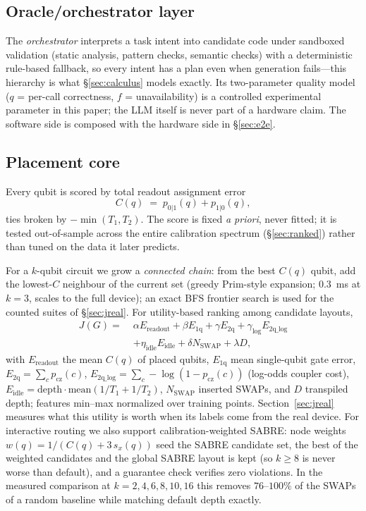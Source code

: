 \documentclass[journal,10pt,twocolumn]{IEEEtran}
\begin{document}
\subsection{Oracle/orchestrator layer}
The \emph{orchestrator} interprets a task intent into candidate code under sandboxed validation (static analysis,
pattern checks, semantic checks) with a deterministic rule-based fallback, so every intent has a plan even when
generation fails---this hierarchy is what \S\ref{sec:calculus} models exactly. Its two-parameter quality model
($q$ = per-call correctness, $f$ = unavailability) is a controlled experimental parameter in this paper; the LLM
itself is never part of a hardware claim. The software side is composed with the hardware side in \S\ref{sec:e2e}.

\subsection{Placement core}
\label{sec:score}
Every qubit is scored by total readout assignment error
\begin{equation}
C(q)\;=\;p_{0|1}(q)+p_{1|0}(q),
\label{eq:cscore}
\end{equation}
ties broken by $-\min(T_1,T_2)$. The score is fixed \emph{a priori}, never fitted; it is tested out-of-sample
across the entire calibration spectrum (\S\ref{sec:ranked}) rather than tuned on the data it later predicts.

For a $k$-qubit circuit we grow a \emph{connected chain}: from the best $C(q)$ qubit, add the lowest-$C$
neighbour of the current set (greedy Prim-style expansion; $0.3$~ms at $k{=}3$, scales to the full device);
an exact BFS frontier search is used for the counted suites of \S\ref{sec:jreal}. For utility-based ranking among
candidate layouts,
\begin{equation}
\begin{aligned}
J(G)=\;&\alpha E_{\mathrm{readout}}+\beta E_{\mathrm{1q}}+\gamma E_{\mathrm{2q}}
+\gamma_{\log}E_{\mathrm{2q\_log}}\\
&+\eta_{\mathrm{idle}}E_{\mathrm{idle}}+\delta N_{\mathrm{SWAP}}+\lambda D,
\end{aligned}
\label{eq:j7}
\end{equation}
with $E_{\mathrm{readout}}$ the mean $C(q)$ of placed qubits, $E_{\mathrm{1q}}$ mean single-qubit gate error,
$E_{\mathrm{2q}}=\sum_c p_{\mathrm{cz}}(c)$, $E_{\mathrm{2q\_log}}=\sum_c-\log(1-p_{\mathrm{cz}}(c))$ (log-odds
coupler cost), $E_{\mathrm{idle}}=\mathrm{depth}\cdot\mathrm{mean}(1/T_1+1/T_2)$, $N_{\mathrm{SWAP}}$ inserted
SWAPs, and $D$ transpiled depth; features min--max normalized over training points. Section~\ref{sec:jreal}
measures what this utility is worth when its labels come from the real device. For interactive routing we also
support calibration-weighted SABRE: node weights $w(q)=1/(C(q)+3\,s_x(q))$ seed the SABRE candidate set, the best
of the weighted candidates and the global SABRE layout is kept (so $k\ge8$ is never worse than default), and a
guarantee check verifies zero violations. In the measured comparison at $k=2,4,6,8,10,16$ this removes
$76$--$100\%$ of the SWAPs of a random baseline while matching default depth exactly.
\end{document}
